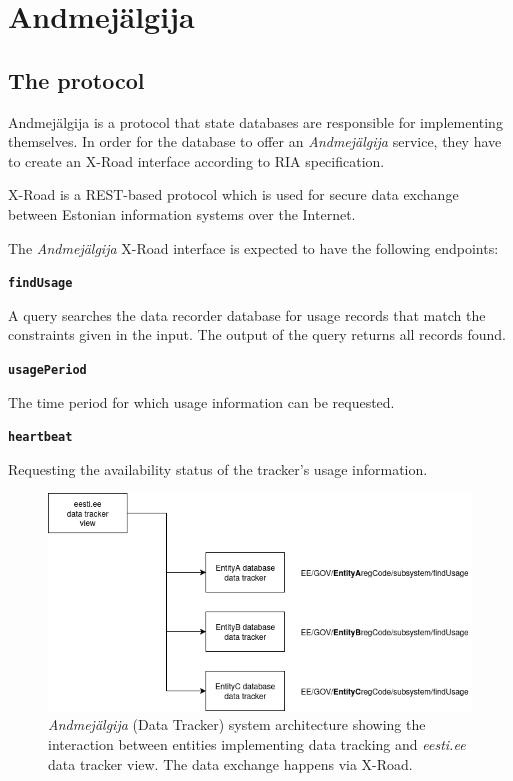 \section{Andmejälgija} \label{Andmejälgija}

\subsection{The protocol} \label{protocol_desc}

Andmejälgija is a protocol that state databases are responsible for implementing themselves. In order for the database to offer an \textit{Andmejälgija} service, they have to create an X-Road interface according to RIA specification\cite{aj-github-spec}. 

X-Road is a REST-based protocol which is used for secure data exchange between Estonian information systems over the Internet.

The \textit{Andmejälgija} X-Road interface is expected to have the following endpoints:

\textbf{\texttt{findUsage}}

A query searches the data recorder database for usage records that match the constraints given in the input. The output of the query returns all records found\cite{aj-github-spec}.

\textbf{\texttt{usagePeriod}}

The time period for which usage information can be requested\cite{aj-github-spec}.

\textbf{\texttt{heartbeat}}

Requesting the availability status of the tracker's usage information\cite{aj-github-spec}.

\begin{figure}[H]
\centering
\includegraphics[width=450px]{english/figures/aj_model.PNG}
\caption{\textit{Andmejälgija} (Data Tracker) system architecture showing the interaction between entities implementing data tracking and \textit{eesti.ee} data tracker view. The data exchange happens via X-Road.}
\label{fig:aj-model}
\end{figure}


